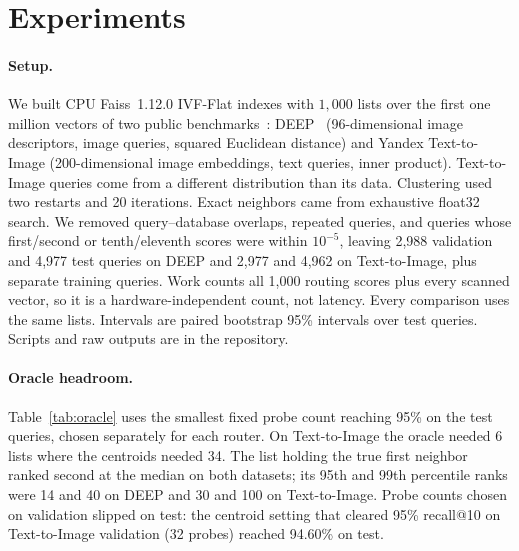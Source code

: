 \documentclass[11pt]{article}
\theoremstyle{definition}
\theoremstyle{remark}
\begin{document}
\section{Experiments}\label{sec:experiments}

\paragraph{Setup.} We built CPU Faiss~1.12.0 IVF-Flat indexes with $1{,}000$ lists over the first one million vectors of two public benchmarks~\cite{simhadri2022bigann}: DEEP~\cite{babenko2016deep} (96-dimensional image descriptors, image queries, squared Euclidean distance) and Yandex Text-to-Image (200-dimensional image embeddings, text queries, inner product). Text-to-Image queries come from a different distribution than its data. Clustering used two restarts and 20 iterations. Exact neighbors came from exhaustive float32 search. We removed query--database overlaps, repeated queries, and queries whose first/second or tenth/eleventh scores were within $10^{-5}$, leaving 2,988 validation and 4,977 test queries on DEEP and 2,977 and 4,962 on Text-to-Image, plus separate training queries. Work counts all 1,000 routing scores plus every scanned vector, so it is a hardware-independent count, not latency. Every comparison uses the same lists. Intervals are paired bootstrap 95\% intervals over test queries. Scripts and raw outputs are in the repository.

\paragraph{Oracle headroom.} Table~\ref{tab:oracle} uses the smallest fixed probe count reaching 95\% on the test queries, chosen separately for each router. On Text-to-Image the oracle needed 6 lists where the centroids needed 34. The list holding the true first neighbor ranked second at the median on both datasets; its 95th and 99th percentile ranks were 14 and 40 on DEEP and 30 and 100 on Text-to-Image. Probe counts chosen on validation slipped on test: the centroid setting that cleared 95\% recall@10 on Text-to-Image validation (32 probes) reached 94.60\% on test.
\end{document}
